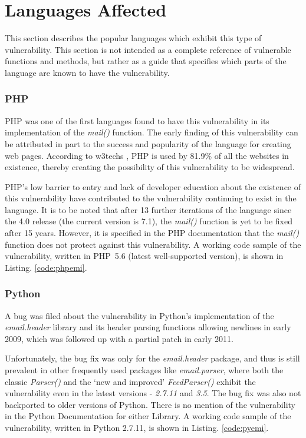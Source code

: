\section{Languages Affected}

This section describes the popular languages which exhibit this type of vulnerability. This section is not intended as a complete reference of vulnerable functions and methods, but rather as a guide that specifies which parts of the language are known to have the vulnerability.

\subsubsection{PHP} 
PHP was one of the first languages found to have this vulnerability in its implementation of the \emph{mail()} function. The early finding of this vulnerability can be attributed in part to the success and popularity of the language for creating web pages. According to w3techs \cite{W3techs}, PHP is used by 81.9\% of all the websites in existence, thereby creating the possibility of this vulnerability to be widespread. 

PHP's low barrier to entry and lack of developer education about the existence of this vulnerability have contributed to the vulnerability continuing to exist in the language.
It is to be noted that after 13 further iterations of the language since the 4.0 release (the current version is 7.1), the \emph{mail()} function is yet to be fixed after 15 years. However, it is specified in the PHP documentation \cite{PHPDocs} that the \emph{mail()} function does not protect against this vulnerability.
A working code sample of the vulnerability, written in PHP~5.6 (latest well-supported version), is shown in  Listing. \ref{code:phpemi}.


\subsubsection{Python} 
A bug was filed about the vulnerability in Python's implementation of the \emph{email.header} library and its header parsing functions allowing newlines in early 2009, which was followed up with a partial patch in early 2011. 

Unfortunately, the bug fix was only for the \emph{email.header} package, and thus is still prevalent in other frequently used packages like \emph{email.parser}, where both the classic \emph{Parser()} and the `new and improved' \emph{FeedParser()} exhibit the vulnerability even in the latest versions - \emph{2.7.11} and \emph{3.5}. The bug fix was also not backported to older versions of Python. 
There is no mention of the vulnerability in the Python Documentation for either Library.
A working code sample of the vulnerability, written in Python 2.7.11, is shown in Listing. \ref{code:pyemi}.

